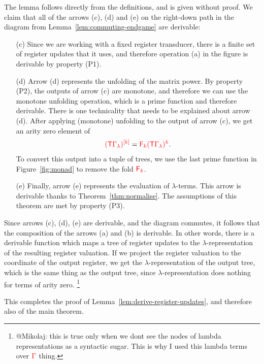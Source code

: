 The lemma follows  directly from the definitions, and is given without proof.  
We claim that all of the arrows (c), (d) and (e) on the  right-down path  in the diagram from Lemma~\ref{lem:commuting-endgame}  are derivable:
\begin{itemize}
    \item[(c)] Since we are working with a fixed register transducer, there is a finite set of register updates that it uses, and therefore  operation (a) in the figure is derivable by property (P1).
    \item[(d)] Arrow (d) represents the unfolding of the matrix power. By property (P2), the outputs of arrow (c) are monotone, and therefore we can use the monotone unfolding operation, which is a  prime function and therefore derivable. There is one technicality that needs to be explained about arrow (d). After applying (monotone) unfolding to the output of arrow (c), we get an  arity zero element of 
    \begin{align*}
        \ranked{
            \mati k {(\tmonad \rGamma_\lambda)}} = \reduce  k {\powersmall{(\tmonad \rGamma_\lambda)}{k}}.
    \end{align*}
    To convert this output into a tuple of trees, we use the last prime function in Figure~\ref{fig:monad} to remove the fold $\reduce k$.
    \item[(e)] Finally, arrow (e) represents the evaluation of $\lambda$-terms. This arrow is derivable thanks to Theorem~\ref{thm:normalise}. The assumptions of this theorem are met by property (P3).
\end{itemize}
Since arrows (c), (d), (e) are derivable, and the diagram commutes, it follows that  the composition of the arrows (a) and (b) is derivable. In other words, there is a derivable function which maps a tree of register updates to the $\lambda$-representation of the resulting register valuation. If we project the register valuation to the coordinate of the output register, we get the $\lambda$-representation of the output tree, which is the same thing as the output tree, since $\lambda$-representation does nothing for terms of arity zero. \footnote{@Mikolaj: this is true only when we dont see the nodes of lambda representations as a syntactic sugar. This is why I used this lambda terms over $\rGamma$ thing. }

This completes the proof of Lemma~\ref{lem:derive-register-updates}, and therefore also of the main theorem. 




